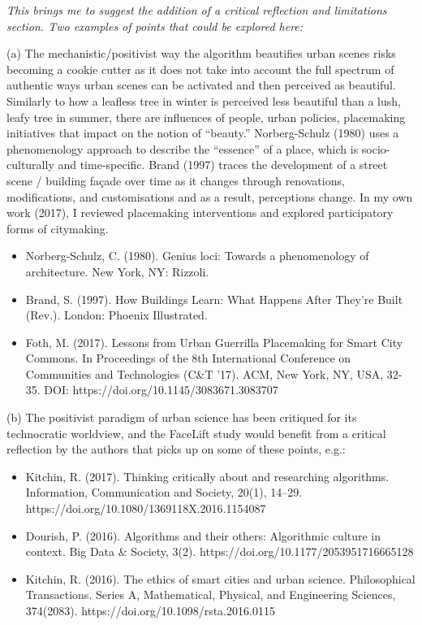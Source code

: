 \documentclass{paper}
\newenvironment{myquote}
{\definecolor{shadecolor}{rgb}{0.9,0.95,1} \begin{shaded*} \sf \em}
{\em\end{shaded*}}
\begin{document}
\begin{myquote}
    This brings me to suggest the addition of a critical reflection and limitations section. Two examples of points that could be explored here: 
    
    (a) The mechanistic/positivist way the algorithm beautifies urban scenes risks becoming a cookie cutter as it does not take into account the full spectrum of authentic ways urban scenes can be activated and then perceived as beautiful. Similarly to how a leafless tree in winter is perceived less beautiful than a lush, leafy tree in summer, there are influences of people, urban policies, placemaking initiatives that impact on the notion of ``beauty.'' Norberg-Schulz (1980) uses a phenomenology approach to describe the ``essence'' of a place, which is socio-culturally and time-specific. Brand (1997) traces the development of a street scene / building façade over time as it changes through renovations, modifications, and customisations and as a result, perceptions change. In my own work (2017), I reviewed placemaking interventions and explored participatory forms of citymaking. 
    \begin{itemize}
    
    \item Norberg-Schulz, C. (1980). Genius loci: Towards a phenomenology of architecture. New York, NY: Rizzoli. 
    
    \item Brand, S. (1997). How Buildings Learn: What Happens After They’re Built (Rev.). London: Phoenix Illustrated. 
    
    \item Foth, M. (2017). Lessons from Urban Guerrilla Placemaking for Smart City Commons. In Proceedings of the 8th International Conference on Communities and Technologies (C\&T '17). ACM, New York, NY, USA, 32-35. DOI: https://doi.org/10.1145/3083671.3083707 
    \end{itemize}
    
    (b) The positivist paradigm of urban science has been critiqued for its technocratic worldview, and the FaceLift study would benefit from a critical reflection by the authors that picks up on some of these points, e.g.: 
		
    \begin{itemize}
    \item Kitchin, R. (2017). Thinking critically about and researching algorithms. Information, Communication and Society, 20(1), 14–29. https://doi.org/10.1080/1369118X.2016.1154087 
    
    \item Dourish, P. (2016). Algorithms and their others: Algorithmic culture in context. Big Data \& Society, 3(2). https://doi.org/10.1177/2053951716665128 
    
    \item Kitchin, R. (2016). The ethics of smart cities and urban science. Philosophical Transactions. Series A, Mathematical, Physical, and Engineering Sciences, 374(2083). https://doi.org/10.1098/rsta.2016.0115 
    
   \end{itemize}
	
\end{myquote}
\end{document}

